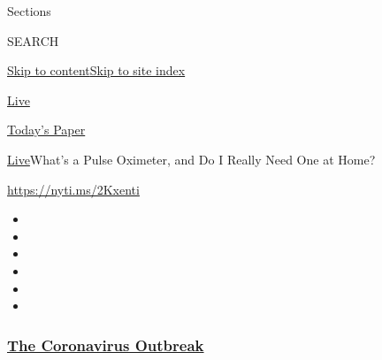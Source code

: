 Sections

SEARCH

\protect\hyperlink{site-content}{Skip to
content}\protect\hyperlink{site-index}{Skip to site index}

\href{https://www.nytimes3xbfgragh.onion/section/well/live}{Live}

\href{https://myaccount.nytimes3xbfgragh.onion/auth/login?response_type=cookie\&client_id=vi}{}

\href{https://www.nytimes3xbfgragh.onion/section/todayspaper}{Today's
Paper}

\href{/section/well/live}{Live}\textbar{}What's a Pulse Oximeter, and Do
I Really Need One at Home?

\url{https://nyti.ms/2Kxenti}

\begin{itemize}
\item
\item
\item
\item
\item
\item
\end{itemize}

\hypertarget{the-coronavirus-outbreak}{%
\subsubsection{\texorpdfstring{\href{https://www.nytimes3xbfgragh.onion/news-event/coronavirus?name=styln-coronavirus-national\&region=TOP_BANNER\&block=storyline_menu_recirc\&action=click\&pgtype=Article\&impression_id=85d5cd50-f4b9-11ea-a9ee-334f178d1f9e\&variant=undefined}{The
Coronavirus
Outbreak}}{The Coronavirus Outbreak}}\label{the-coronavirus-outbreak}}

